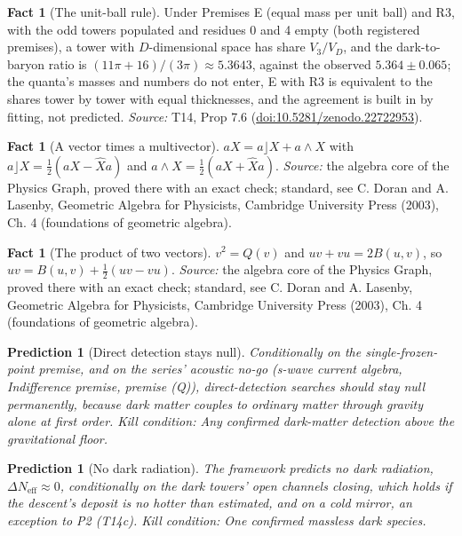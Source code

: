 \documentclass[11pt]{article}
\newtheorem{prediction}[theorem]{Prediction}
\theoremstyle{definition}
\newtheorem{fact}[theorem]{Fact}
\theoremstyle{plain}
\providecommand{\Neff}{}\renewcommand{\Neff}{N_{\mathrm{eff}}}
\begin{document}
\begin{fact}[The unit-ball rule]\label{c:dark-matter.unit-ball-rule}
Under Premises E (equal mass per unit ball) and R3, with the odd towers populated and residues 0 and 4 empty (both registered premises), a tower with $D$-dimensional space has share $V_{3}/V_{D}$, and the dark-to-baryon ratio is $(11\pi + 16)/(3\pi) \approx 5.3643$, against the observed $5.364 \pm 0.065$; the quanta's masses and numbers do not enter, E with R3 is equivalent to the shares tower by tower with equal thicknesses, and the agreement is built in by fitting, not predicted.
\emph{Source:} T14, Prop 7.6 (\href{https://doi.org/10.5281/zenodo.22722953}{doi:10.5281/zenodo.22722953}).
\end{fact}

\begin{fact}[A vector times a multivector]\label{c:std-algebra.product-decomposition}
$aX = a \rfloor X + a \wedge X$ with $a \rfloor X = \tfrac12(aX - \hat{X}a)$ and $a \wedge X = \tfrac12(aX + \hat{X}a)$.
\emph{Source:} the algebra core of the Physics Graph, proved there with an exact check; standard, see C. Doran and A. Lasenby, Geometric Algebra for Physicists, Cambridge University Press (2003), Ch. 4 (foundations of geometric algebra).
\end{fact}

\begin{fact}[The product of two vectors]\label{c:std-algebra.vector-squares}
$v^{2} = Q(v)$ and $uv + vu = 2B(u, v)$, so $uv = B(u, v) + \tfrac12(uv - vu)$.
\emph{Source:} the algebra core of the Physics Graph, proved there with an exact check; standard, see C. Doran and A. Lasenby, Geometric Algebra for Physicists, Cambridge University Press (2003), Ch. 4 (foundations of geometric algebra).
\end{fact}

\begin{prediction}[Direct detection stays null]\label{c:pred.dark-matter-direct-detection-null}
Conditionally on the single-frozen-point premise, and on the series' acoustic no-go (s-wave current algebra, Indifference premise, premise (Q)), direct-detection searches should stay null permanently, because dark matter couples to ordinary matter through gravity alone at first order.
\emph{Kill condition:} Any confirmed dark-matter detection above the gravitational floor.
\end{prediction}

\begin{prediction}[No dark radiation]\label{c:pred.no-dark-radiation}
The framework predicts no dark radiation, $\Delta\Neff \approx 0$, conditionally on the dark towers' open channels closing, which holds if the descent's deposit is no hotter than estimated, and on a cold mirror, an exception to P2 (T14c).
\emph{Kill condition:} One confirmed massless dark species.
\end{prediction}
\end{document}

